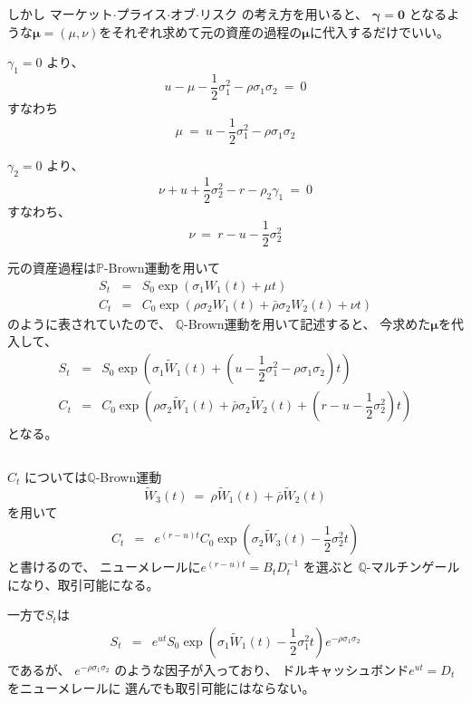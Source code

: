 \documentclass[uplatex,a4j,12pt,dvipdfmx]{jsarticle}
\begin{document}
しかし
マーケット$\cdot$プライス$\cdot$オブ$\cdot$リスク
の考え方を用いると、
${\bm \gamma} = {\bm 0}$
となるような${\bm \mu} = (\mu,\nu)$をそれぞれ求めて元の資産の過程の${\bm \mu}$に代入するだけでいい。

$\gamma_{1} = 0$
より、
$$
	u
	-
	\mu - \dfrac{1}{2} \sigma_{1}^{2} - \rho \sigma_{1} \sigma_{2}
	\ = \ 0
$$
すなわち
$$
	\mu
	\ = \
	u - \dfrac{1}{2} \sigma_{1}^{2} - \rho \sigma_{1} \sigma_{2}
$$

$\gamma_{2} = 0$
より、
$$
	\nu + u + \dfrac{1}{2} \sigma_{2}^{2} - r - \rho_{2} \gamma_{1}
	\ = \
	0
$$
すなわち、
$$
	\nu
	\ = \
	r - u - \dfrac{1}{2} \sigma_{2}^{2}
$$

元の資産過程は$\mathbb{P}$-Brown運動を用いて
%
%
\begin{eqnarray*}
	S_{t}
	&=&
	S_{0}
	\exp \left( \sigma_{1} W_{1}(t) + \mu t \right)
	\\
	C_{t}
	&=&
	C_{0}
	\exp \left(
	\rho \sigma_{2} W_{1}(t) +
	\bar{\rho} \sigma_{2} W_{2}(t) + \nu t \right)
\end{eqnarray*}
%
%
のように表されていたので、
$\mathbb{Q}$-Brown運動を用いて記述すると、
今求めた${\bm \mu}$を代入して、
%
%
\begin{eqnarray*}
	S_{t}
	&=&
	S_{0}
	\exp \left( \sigma_{1} \tilde{W}_{1}(t) +
	\left(
		u - \dfrac{1}{2} \sigma_{1}^{2} - \rho \sigma_{1} \sigma_{2}
		\right)
	t \right)
	\\
	C_{t}
	&=&
	C_{0}
	\exp \left(
	\rho \sigma_{2} \tilde{W}_{1}(t) +
	\bar{\rho} \sigma_{2} \tilde{W}_{2}(t) +
	\left(
		r - u - \dfrac{1}{2} \sigma_{2}^{2}
		\right)
	t \right)
\end{eqnarray*}
%
%
となる。

${}$

$C_{t}$
については$\mathbb{Q}$-Brown運動
$$
	\tilde{W}_{3}(t)
	\ = \
	\rho \tilde{W}_{1}(t) +
	\bar{\rho} \tilde{W}_{2}(t)
$$
を用いて
%
%
\begin{eqnarray*}
	C_{t}
	&=&
	e^{(r-u)t}
	C_{0}
	\exp \left(
	\sigma_{2} \tilde{W}_{3}(t) -
	\dfrac{1}{2} \sigma_{2}^{2}
	t \right)
\end{eqnarray*}
%
%
と書けるので、
ニューメレールに$e^{(r-u)t} = B_{t} D^{-1}_{t}$
を選ぶと
$\mathbb{Q}$-マルチンゲールになり、取引可能になる。

一方で$S_{t}$は
%
%
\begin{eqnarray*}
	S_{t}
	&=&
	e^{ut}
	S_{0}
	\exp \left( \sigma_{1} \tilde{W}_{1}(t) -
	\dfrac{1}{2} \sigma_{1}^{2}
	t \right)
	e^{- \rho \sigma_{1} \sigma_{2}}
\end{eqnarray*}
%
%
であるが、
$e^{- \rho \sigma_{1} \sigma_{2}}$
のような因子が入っており、
ドルキャッシュボンド$e^{ut} = D_{t}$をニューメレールに
選んでも取引可能にはならない。
\end{document}
